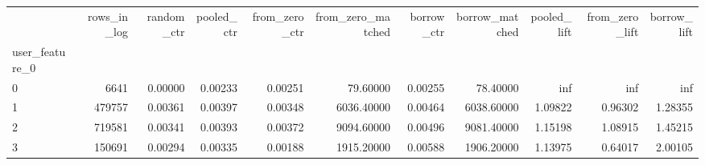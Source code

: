 \begin{tabular}{lrrrrrrrrrr}
\toprule
 & rows\_in\_log & random\_ctr & pooled\_ctr & from\_zero\_ctr & from\_zero\_matched & borrow\_ctr & borrow\_matched & pooled\_lift & from\_zero\_lift & borrow\_lift \\
user\_feature\_0 &  &  &  &  &  &  &  &  &  &  \\
\midrule
0 & 6641 & 0.00000 & 0.00233 & 0.00251 & 79.60000 & 0.00255 & 78.40000 & inf & inf & inf \\
1 & 479757 & 0.00361 & 0.00397 & 0.00348 & 6036.40000 & 0.00464 & 6038.60000 & 1.09822 & 0.96302 & 1.28355 \\
2 & 719581 & 0.00341 & 0.00393 & 0.00372 & 9094.60000 & 0.00496 & 9081.40000 & 1.15198 & 1.08915 & 1.45215 \\
3 & 150691 & 0.00294 & 0.00335 & 0.00188 & 1915.20000 & 0.00588 & 1906.20000 & 1.13975 & 0.64017 & 2.00105 \\
\bottomrule
\end{tabular}
